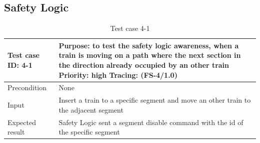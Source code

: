 \subsection{Safety Logic}

\begin{table}[H]
	\caption{Test case 4-1}
	\label{table:TCase-FS4-1}
	\begin{center}
		\renewcommand{\arraystretch}{1.8}
		\begin{tabu} 
			to 0.9 \textwidth
			{  X[0.4, c] X[c] }
			\toprule
			Test case ID: 4-1 & Purpose: to test the safety logic awareness, when a train is moving on a path where the next section in the direction already occupied by an other train \newline Priority: high \newline Tracing: (FS-4/1.0) \\ \midrule
			Precondition      & None                                                                                                                                                                                                          \\
			Input             & Insert a train to a specific segment and move an other train to the adjacent segment                                                                                                                          \\
			Expected result   & Safety Logic sent a segment disable command with the id of the specific segment                                                                                                                               \\ \bottomrule
		\end{tabu}
	\end{center}
\end{table} 


